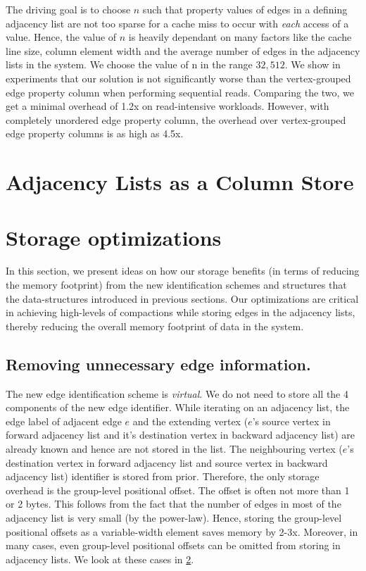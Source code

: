 The driving goal is to choose $n$ such that property values of edges in a defining adjacency list are not too sparse for a cache miss to occur with \emph{each} access of a value. Hence, the value of $n$ is heavily dependant on many factors like the cache line size, column element width and the average number of edges in the adjacency lists in the system. We choose the value of n in the range $32, 512$. We show in experiments that our solution is not significantly worse than the vertex-grouped edge property column when performing sequential reads. Comparing the two, we get a minimal overhead of 1.2x on read-intensive workloads. However, with completely unordered edge property column, the overhead over vertex-grouped edge property columns is as high as 4.5x.

\section{Adjacency Lists as a Column Store}
\label{sec:adjacency-lists}



\section{Storage optimizations}
\label{sec:storage-optimizations}

In this section, we present ideas on how our storage benefits (in terms of reducing the memory footprint) from the new identification schemes and structures that the data-structures introduced in previous sections. Our optimizations are critical in achieving high-levels of compactions while storing edges in the adjacency lists, thereby reducing the overall memory footprint of data in the system.

\subsection{Removing unnecessary edge information.}

The new edge identification scheme is \emph{virtual}. We do not need to store all the 4 components of the new edge identifier. While iterating on an adjacency list, the edge label of adjacent edge $e$ and the extending vertex ($e$'s source vertex in forward adjacency list and it's destination vertex in backward adjacency list) are already known and hence are not stored in the list. The neighbouring vertex ($e$'s destination vertex in forward adjacency list and source vertex in backward adjacency list) identifier is stored from prior. Therefore, the only storage overhead is the group-level positional offset. The offset is often not more than 1 or 2 bytes. This follows from the fact that the number of edges in most of the adjacency list is very small (by the power-law). Hence, storing the group-level positional offsets as a variable-width element saves memory by 2-3x. Moreover, in many cases, even group-level positional offsets can be omitted from storing in adjacency lists. We look at these cases in \ref{sec:storage-optimizations}.

